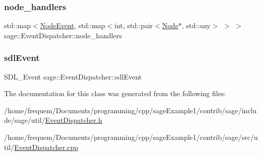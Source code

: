 \mbox{\label{classsage_1_1EventDispatcher_aefdb6a3e004a7bec95ae6f0845ba8d05}} 
\subsubsection{\texorpdfstring{node\_handlers}{node\_handlers}}
{\footnotesize\ttfamily std\+::map$<$\mbox{\hyperlink{namespacesage_ad2c7b0e1ebf67f572d43620e6b07aa13}{Node\+Event}}, std\+::map$<$int, std\+::pair$<$\mbox{\hyperlink{classsage_1_1Node}{Node}}$\ast$, std\+::any$>$ $>$ $>$ sage\+::\+Event\+Dispatcher\+::node\+\_\+handlers\hspace{0.3cm}{\ttfamily [private]}}

\mbox{\label{classsage_1_1EventDispatcher_acc93b97b0ed92a64ab2e2040dc8ca04c}} 
\subsubsection{\texorpdfstring{sdlEvent}{sdlEvent}}
{\footnotesize\ttfamily S\+D\+L\+\_\+\+Event sage\+::\+Event\+Dispatcher\+::sdl\+Event\hspace{0.3cm}{\ttfamily [private]}}



The documentation for this class was generated from the following files\+:\begin{DoxyCompactItemize}
\item 
/home/frequem/\+Documents/programming/cpp/sage\+Example1/contrib/sage/include/sage/util/\mbox{\hyperlink{EventDispatcher_8h}{Event\+Dispatcher.\+h}}\item 
/home/frequem/\+Documents/programming/cpp/sage\+Example1/contrib/sage/src/util/\mbox{\hyperlink{EventDispatcher_8cpp}{Event\+Dispatcher.\+cpp}}\end{DoxyCompactItemize}
